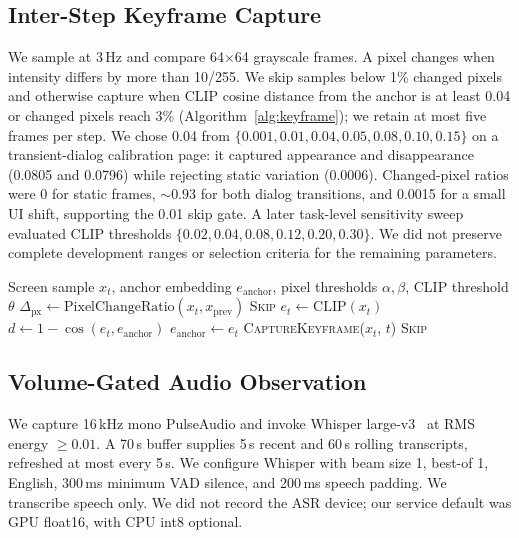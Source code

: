\documentclass[letterpaper]{article} %
\begin{document}
\subsection{Inter-Step Keyframe Capture}
\label{sec:keyframes}

We sample at 3\,Hz and compare 64$\times$64 grayscale frames. A pixel changes when intensity differs by more than 10/255. We skip samples below 1\% changed pixels and otherwise capture when CLIP cosine distance from the anchor is at least 0.04 or changed pixels reach 3\% (Algorithm~\ref{alg:keyframe}); we retain at most five frames per step. We chose 0.04 from $\{0.001,0.01,0.04,0.05,0.08,0.10,0.15\}$ on a transient-dialog calibration page: it captured appearance and disappearance (0.0805 and 0.0796) while rejecting static variation (0.0006). Changed-pixel ratios were 0 for static frames, ${\sim}0.93$ for both dialog transitions, and 0.0015 for a small UI shift, supporting the 0.01 skip gate. A later task-level sensitivity sweep evaluated CLIP thresholds $\{0.02,0.04,0.08,0.12,0.20,0.30\}$. We did not preserve complete development ranges or selection criteria for the remaining parameters.

\begin{algorithm}[t]
\caption{Adaptive keyframe extraction used in the main experiments.}
\label{alg:keyframe}
\begin{algorithmic}[1]
\REQUIRE Screen sample $x_t$, anchor embedding $e_\text{anchor}$, pixel thresholds $\alpha,\beta$, CLIP threshold $\theta$
\STATE $\Delta_\text{px} \leftarrow \text{PixelChangeRatio}(x_t, x_\text{prev})$
  \RETURN \textsc{Skip} 
\ENDIF
\STATE $e_t \leftarrow \text{CLIP}(x_t)$
\STATE $d \leftarrow 1 - \cos(e_t, e_\text{anchor})$
  \STATE $e_\text{anchor} \leftarrow e_t$ 
  \RETURN \textsc{CaptureKeyframe}($x_t$, $t$)
\ENDIF
\RETURN \textsc{Skip} 
\end{algorithmic}
\end{algorithm}

\subsection{Volume-Gated Audio Observation}
\label{sec:audio}

We capture 16\,kHz mono PulseAudio and invoke Whisper large-v3~\citep{whisper} at RMS energy $\geq0.01$. A 70\,s buffer supplies 5\,s recent and 60\,s rolling transcripts, refreshed at most every 5\,s. We configure Whisper with beam size 1, best-of 1, English, 300\,ms minimum VAD silence, and 200\,ms speech padding. We transcribe speech only. We did not record the ASR device; our service default was GPU float16, with CPU int8 optional.
\end{document}
